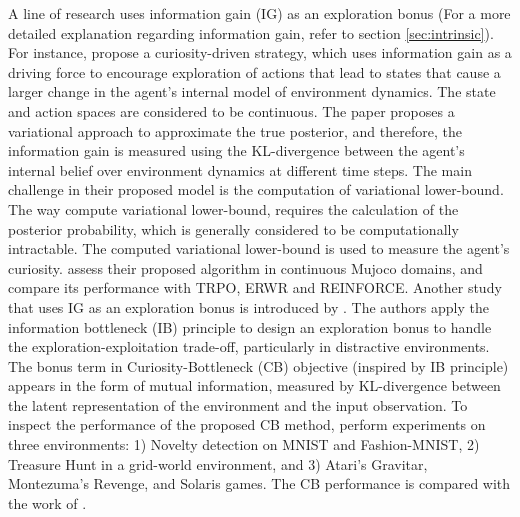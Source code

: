 A line of research uses information gain (IG) as an exploration bonus (For a more detailed explanation regarding information gain, refer to section \ref{sec:intrinsic}). For instance,  propose a curiosity-driven strategy, which uses information gain as a driving force to encourage exploration of actions that lead to states that cause a larger change in the agent’s internal model of environment dynamics. The state and action spaces are considered to be continuous. The paper proposes a variational approach to approximate the true posterior, and therefore, the information gain is measured using the KL-divergence between the agent’s internal belief over environment dynamics at different time steps. The main challenge in their proposed model is the computation of variational lower-bound. The way  compute variational lower-bound, requires the calculation of the posterior probability, which is generally considered to be computationally intractable. The computed variational lower-bound is used to measure the agent’s curiosity.  assess their proposed algorithm in continuous Mujoco domains, and compare its performance with TRPO, ERWR and REINFORCE. 
Another study that uses IG as an exploration bonus is introduced by . The authors apply the information bottleneck (IB) principle  to design an exploration bonus to handle the exploration-exploitation trade-off, particularly in distractive environments. The bonus term in Curiosity-Bottleneck (CB) objective (inspired by IB principle) appears in the form of mutual information, measured by KL-divergence between the latent representation of the environment and the input observation. To inspect the performance of the proposed CB method,  perform experiments on three environments: 1) Novelty detection on MNIST and Fashion-MNIST, 2) Treasure Hunt in a grid-world environment, and 3) Atari's Gravitar, Montezuma’s Revenge, and Solaris  games. The CB performance is compared with the work of .


